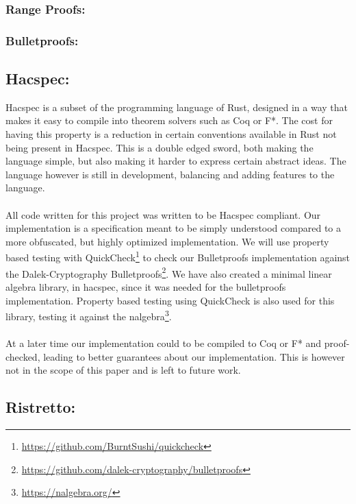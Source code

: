 \documentclass{article}
\begin{document}
\subsubsection{Range Proofs:}

\subsubsection{Bulletproofs:}


\subsection{Hacspec:} \label{Hacspec}

Hacspec is a subset of the programming language of Rust, designed in a way that makes it easy to compile into theorem solvers such as Coq or F*. The cost for having this property is a reduction in certain conventions available in Rust not being present in Hacspec. This is a double edged sword, both making the language simple, but also making it harder to express certain abstract ideas. The language however is still in development, balancing and adding features to the language.
\\\\
All code written for this project was written to be Hacspec compliant. Our implementation is a specification meant to be simply understood compared to a more obfuscated, but highly optimized implementation. We will use property based testing with QuickCheck\footnote{\url{https://github.com/BurntSushi/quickcheck}} to check our Bulletproofs implementation against the Dalek-Cryptography Bulletproofs\footnote{\url{https://github.com/dalek-cryptography/bulletproofs}}. We have also created a minimal linear algebra library, in hacspec, since it was needed for the bulletproofs implementation. Property based testing using QuickCheck is also used for this library, testing it against the nalgebra\footnote{\url{https://nalgebra.org/}}.
\\\\
At a later time our implementation could to be compiled to Coq or F* and proof-checked, leading to better guarantees about our implementation. This is however not in the scope of this paper and is left to future work. %

\subsection{Ristretto:} \label{ristretto}
\end{document}

